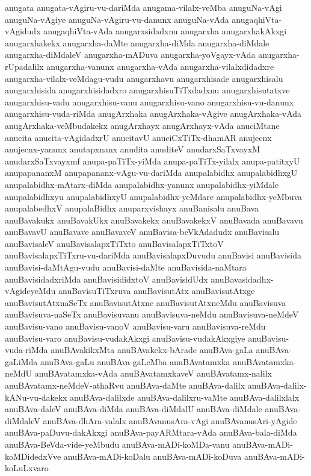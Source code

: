 {anugata
anugata-vAgiru-vu-dariMda
anugama-vilalx-veMba
anuguNa-vAgi
anuguNa-vAgiye
anuguNa-vAgiru-vu-danunx
anuguNa-vAda
anugaqhiVta-vAgidudx
anugaqhiVta-vAda
anugarxsidadxnu
anugarxha
anugarxhakAkxgi
anugarxhakekx
anugarxha-daMte
anugarxha-diMda
anugarxha-diMdale
anugarxha-diMdaleV
anugarxha-mADuva
anugarxha-yoVgayx-vAda
anugarxha-rUpadalilx
anugarxha-vanunx
anugarxha-vAda
anugarxha-vilalxdidadxre
anugarxha-vilalx-veMdagu-vudu
anugarxhavu
anugarxhisade
anugarxhisalu
anugarxhisida
anugarxhisidadxro
anugarxhisuTiTxdadxnu
anugarxhisutatxve
anugarxhisu-vadu
anugarxhisu-vanu
anugarxhisu-vano
anugarxhisu-vu-danunx
anugarxhisu-vuda-riMda
anugArxhaka
anugArxhaka-vAgive
anugArxhaka-vAda
anugArxhaka-veMbudakekx
anugArxhayx
anugArxhayx-vAda
anuciMtane
anucita
anucita-vAgidadxrU
anucitavU
anuciCxTiTx-dhamAR
anujecnx
anujecnx-yanunx
anutapxnanx
anudita
anuditeV
anudarxSaTxvayxM
anudarxSaTxvayxmf
anupa-paTiTx-yiMda
anupa-paTiTx-yilalx
anupa-patitxyU
anupapananxM
anupapananx-vAgu-vu-dariMda
anupalabidhx
anupalabidhxgU
anupalabidhx-mAtarx-diMda
anupalabidhx-yanunx
anupalabidhx-yiMdale
anupalabidhxyu
anupalabidhxyU
anupalabidhx-yeMdare
anupalabidhx-yeMbuva
anupalabedhxV
anupalaBidhx
anuparxvishayx
anuBanisalu
anuBava
anuBavakukx
anuBavakUkx
anuBavakekx
anuBavakekxV
anuBavada
anuBavavu
anuBavavU
anuBavave
anuBavaveV
anuBavisa-beVkAdadudx
anuBavisalu
anuBavisaleV
anuBavisalapxTiTxto
anuBavisalapxTiTxtoV
anuBavisalapxTiTxru-vu-dariMda
anuBavisalapxDuvudu
anuBavisi
anuBavisida
anuBavisi-daMtAgu-vudu
anuBavisi-daMte
anuBavisida-naMtara
anuBavisidadxriMda
anuBavisididxtoV
anuBavisidUdx
anuBavasidadhx-vAgideyeMdu
anuBavisuTiTxruva
anuBavisutAtx
anuBavisutAtxge
anuBavisutAtxnaSeTx
anuBavisutAtxne
anuBavisutAtxneMdu
anuBavisuva
anuBavisuva-naSeTx
anuBavisuvanu
anuBavisuva-neMdu
anuBavisuva-neMdeV
anuBavisu-vano
anuBavisu-vanoV
anuBavisu-varu
anuBavisuva-reMdu
anuBavisu-varo
anuBavisu-vudakAkxgi
anuBavisu-vudakAkxgiye
anuBavisu-vuda-riMda
anuBAvakikxMta
anuBAvakekx-bArade
anuBAva-gaLa
anuBAva-gaLiMda
anuBAva-gaLu
anuBAva-gaLeMba
anuBAvatamxka
anuBAvatamxka-neMdU
anuBAvatamxka-vAda
anuBAvatamxkaveV
anuBAvatamx-nalilx
anuBAvatamx-neMdeV-athaRvu
anuBAva-daMte
anuBAva-dalilx
anuBAva-dalilx-kANu-vu-dakekx
anuBAva-dalilxde
anuBAva-dalilxru-vaMte
anuBAva-dalilxlalx
anuBAva-daleV
anuBAva-diMda
anuBAva-diMdalU
anuBAva-diMdale
anuBAva-diMdaleV
anuBAva-dhAra-valalx
anuBAvanusAra-vAgi
anuBAvanusAri-yAgide
anuBAva-paDuvu-dakAkxgi
anuBAva-payARMtara-vAda
anuBAva-bala-diMda
anuBAva-BeVda-vide-yeMbudu
anuBAva-mADi-koMDa-vanu
anuBAva-mADi-koMDidedxVve
anuBAva-mADi-koDalu
anuBAva-mADi-koDuva
anuBAva-mADi-koLuLxvaro
}
